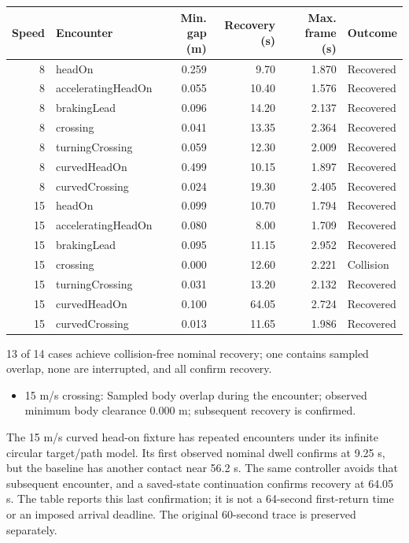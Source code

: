 \documentclass[11pt]{article}
\begin{document}
\begin{center}\small
\begin{tabular}{rlrrrl}\toprule
Speed & Encounter & Min. gap (m) & Recovery (s) & Max. frame (s) & Outcome\\\midrule
8 & headOn & 0.259 & 9.70 & 1.870 & Recovered \\
8 & acceleratingHeadOn & 0.055 & 10.40 & 1.576 & Recovered \\
8 & brakingLead & 0.096 & 14.20 & 2.137 & Recovered \\
8 & crossing & 0.041 & 13.35 & 2.364 & Recovered \\
8 & turningCrossing & 0.059 & 12.30 & 2.009 & Recovered \\
8 & curvedHeadOn & 0.499 & 10.15 & 1.897 & Recovered \\
8 & curvedCrossing & 0.024 & 19.30 & 2.405 & Recovered \\
15 & headOn & 0.099 & 10.70 & 1.794 & Recovered \\
15 & acceleratingHeadOn & 0.080 & 8.00 & 1.709 & Recovered \\
15 & brakingLead & 0.095 & 11.15 & 2.952 & Recovered \\
15 & crossing & 0.000 & 12.60 & 2.221 & Collision \\
15 & turningCrossing & 0.031 & 13.20 & 2.132 & Recovered \\
15 & curvedHeadOn & 0.100 & 64.05 & 2.724 & Recovered \\
15 & curvedCrossing & 0.013 & 11.65 & 1.986 & Recovered \\
\bottomrule\end{tabular}\end{center}

13 of 14 cases achieve collision-free nominal recovery; one contains sampled overlap, none are interrupted, and all confirm recovery.
\begin{itemize}
\item 15 m/s crossing: Sampled body overlap during the encounter; observed minimum body clearance 0.000 m; subsequent recovery is confirmed.
\end{itemize}

The 15 m/s curved head-on fixture has repeated encounters under its infinite
circular target/path model. Its first observed nominal dwell confirms at
9.25 s, but the baseline has another contact near 56.2 s. The same controller
avoids that subsequent encounter, and a saved-state continuation confirms
recovery at 64.05 s. The table reports this last confirmation; it is not a
64-second first-return time or an imposed arrival deadline. The original
60-second trace is preserved separately.
\end{document}
